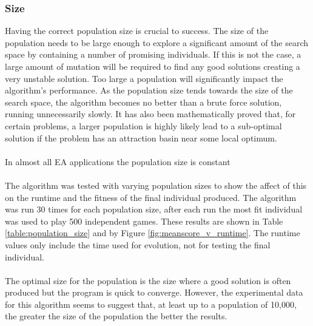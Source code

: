 \documentclass{article}
\begin{document}
\subsubsection{Size}
\label{population_size}
Having the correct population size is crucial to success\cite{dynamic_population}. The size of the population needs to be large enough to explore a significant amount of the search space by containing a number of promising individuals. If this is not the case, a large amount of mutation will be required to find any good solutions creating a very unstable solution. Too large a population will significantly impact the algorithm's performance. As the population size tends towards the size of the search space, the algorithm becomes no better than a brute force solution, running unnecessarily slowly. It has also been mathematically proved that, for certain problems, a larger population is highly likely lead to a sub-optimal solution if the problem has an attraction basin near some local optimum\cite{unhelpful_large_populations}.
\\\\
In almost all EA applications the population size is constant\cite[p. 20]{textbook}
\\\\
The algorithm was tested with varying population sizes to show the affect of this on the runtime and the fitness of the final individual produced. The algorithm was run 30 times for each population size, after each run the most fit individual was used to play 500 independent games. These results are shown in Table \ref{table:population_size} and by Figure \ref{fig:meanscore_v_runtime}. The runtime values only include the time used for evolution, not for testing the final individual.
\\\\
The optimal size for the population is the size where a good solution is often produced but the program is quick to converge\cite{optimal_population_size}. However, the experimental data for this algorithm seems to suggest that, at least up to a population of 10,000, the greater the size of the population the better the results. %
\end{document}
